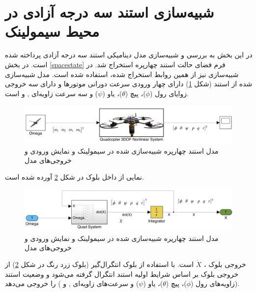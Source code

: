 \section{شبیه‌سازی استند سه درجه آزادی در محیط سیمولینک}\label{quadall3}
در این بخش به بررسی و شبیه‌سازی مدل دینامیکی استند سه درجه آزادی پرداخته شده است. در بخش \ref{spacestate} فرم فضای حالت استند چهارپره استخراج شد. در شبیه‌سازی نیز از همین روابط استخراج شده، استفاده شده است. مدل شبیه‌سازی شده از استند (شکل \ref{quadsimulink}) دارای چهار ورودی سرعت دورانی موتورها  و دارای سه خروجی زوایای رول ($\phi$)، پیچ ($\theta$)، یاو ($\psi$) و  سه سرعت زاویه‌ای
 ,
 و 
 است.
 
 
\begin{figure}[H]
	\includegraphics[width=16cm]{../Figures/QuadSimulation/Stand_Model.png}
	\centering
	\vspace*{-15mm}
	\caption{مدل استند چهارپره شبیه‌سازی شده در سیمولینک و نمایش ورودی و خروجی‌های مدل}
	\label{quadsimulink}
\end{figure}
نمایی از داخل بلوک
در شکل \ref{Quad3DOF} آورده شده است.
\begin{figure}[H]
	\includegraphics[width=16cm]{../Figures/QuadSimulation/Integrator.png}
	\centering
	\vspace*{-15mm}
	\caption{مدل استند چهارپره شبیه‌سازی شده در سیمولینک و نمایش ورودی و خروجی‌های مدل}
	\label{Quad3DOF}
\end{figure}
خروجی بلوک
،
$\dot X$
است. با استفاده از بلوک انتگرال‌گیر (بلوک زرد رنگ در شکل \ref{Quad3DOF})
از خروجی بلوک بر اساس شرایط اولیه استند انتگرال گرفته می‌شود و وضعیت استند (زاویه‌های رول ($\phi$)، پیچ ($\theta$)، یاو ($\psi$) و سرعت‌های زاویه‌ای‌
 ,
و 
)
را خروجی می‌دهد.

